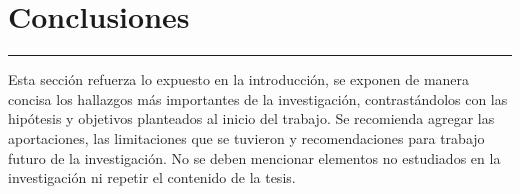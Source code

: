 
\chapter{Conclusiones}\label{capit:cap5}
\vspace{-2.0325ex}%
\noindent
\rule{\textwidth}{0.5pt}
\vspace{-5.5ex}%
\newcommand{\pushline}{\Indp}%


Esta sección refuerza lo expuesto en la introducción, se exponen de manera concisa los hallazgos más importantes de la investigación, contrastándolos con las hipótesis y objetivos planteados al inicio del trabajo. Se recomienda agregar las aportaciones, las limitaciones que se tuvieron y recomendaciones para trabajo futuro de la investigación. No se deben mencionar elementos no estudiados en la investigación ni repetir el contenido de la tesis. 




\newpage
